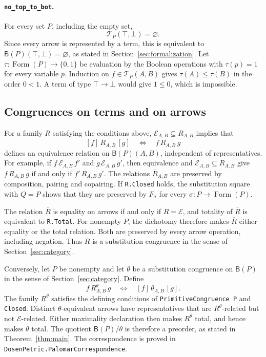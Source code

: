 \documentclass[11pt]{article}
\newcommand{\B}{\mathsf B}
\newcommand{\FormulaSet}{\operatorname{Form}}
\begin{document}
\paragraph{\texttt{no\_top\_to\_bot}.}
For every set $P$, including the empty set,
\[
 \mathcal T_P(\top,\bot)=\varnothing.
\]
Since every arrow is represented by a term, this is equivalent to
$\B(P)(\top,\bot)=\varnothing$, as stated in
Section~\ref{sec:formalization}.
Let $\tau:\FormulaSet(P)\to\{0,1\}$ be evaluation by the Boolean
operations with $\tau(p)=1$ for every variable $p$.
Induction on $f\in\mathcal T_P(A,B)$ gives $\tau(A)\leq\tau(B)$
in the order $0<1$. A term of type
$\top\to\bot$ would give $1\leq0$, which is impossible.

\subsection{Congruences on terms and on arrows}

For a family $R$ satisfying the conditions above,
$\mathcal E_{A,B}\subseteq R_{A,B}$ implies that
\[
 [f]\,\overline R_{A,B}\,[g]
 \quad\Longleftrightarrow\quad f\,R_{A,B}\,g
\]
defines an equivalence relation on $\B(P)(A,B)$, independent of
representatives. For example, if
$f\,\mathcal E_{A,B}\,f'$ and $g\,\mathcal E_{A,B}\,g'$, then
equivalence and $\mathcal E_{A,B}\subseteq R_{A,B}$ give
$f\,R_{A,B}\,g$ if and only if $f'\,R_{A,B}\,g'$.
The relations $\overline R_{A,B}$ are preserved by composition,
pairing and copairing. If \texttt{R.Closed} holds, the substitution
square with $Q=P$ shows that they are preserved by $F_\sigma$ for
every $\sigma:P\to\FormulaSet(P)$.

The relation $\overline R$ is equality on arrows if and only if
$R=\mathcal E$, and totality of $\overline R$ is equivalent to
\texttt{R.Total}. For nonempty $P$, the dichotomy therefore makes
$\overline R$ either equality or the total relation. Both are preserved
by every arrow operation, including negation. Thus $\overline R$ is a
substitution congruence in the sense of Section~\ref{sec:category}.

Conversely, let $P$ be nonempty and let $\theta$ be a substitution
congruence on $\B(P)$ in the sense of Section~\ref{sec:category}.
Define
\[
 f\,R^\theta_{A,B}\,g
 \quad\Longleftrightarrow\quad [f]\,\theta_{A,B}\,[g].
\]
The family $R^\theta$ satisfies the defining conditions of
\texttt{PrimitiveCongruence P} and \texttt{Closed}.
Distinct $\theta$-equivalent arrows have representatives that are
$R^\theta$-related but not $\mathcal E$-related. Either maximality
declaration then makes $R^\theta$ total, and hence makes $\theta$ total.
The quotient $\B(P)/\theta$ is therefore a preorder, as stated in
Theorem~\ref{thm:main}.
The correspondence is proved in
\texttt{DosenPetric.PalomarCorrespondence}.
\end{document}

